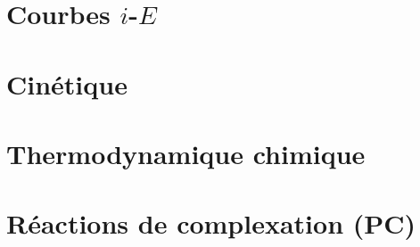 \section{Courbes $i$-$E$}



\section{Cinétique}



\section{Thermodynamique chimique}


%

\section{Réactions de complexation (PC)}






